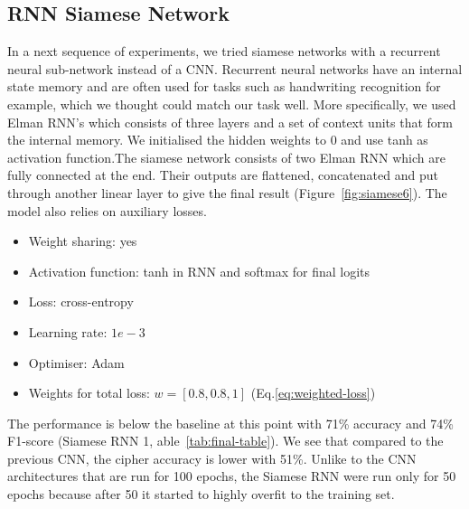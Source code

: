 \documentclass[10pt,conference,compsocconf]{IEEEtran}
\begin{document}

\subsection{RNN Siamese Network}
In a next sequence of experiments, we tried siamese networks with a recurrent neural sub-network instead of a CNN. Recurrent neural networks have an internal state memory and are often used for tasks such as handwriting recognition for example, which we thought could match our task well. More specifically, we used Elman RNN's which consists of three layers and a set of context units that form the internal memory. We initialised the hidden weights to 0 and use tanh as activation function.The siamese network consists of two Elman RNN which are fully connected at the end. Their outputs are flattened, concatenated and put through another linear layer to give the final result (Figure~\ref{fig:siamese6}). The model also relies on auxiliary losses.
\begin{itemize}
    \item Weight sharing: yes 
    \item Activation function: tanh in RNN and softmax for final logits
    \item Loss: cross-entropy
    \item Learning rate: $1e-3$
    \item Optimiser: Adam
    \item Weights for total loss: $w = [0.8, 0.8, 1]$ (Eq.\ref{eq:weighted-loss})
\end{itemize}

The performance is below the baseline at this point with 71\% accuracy and 74\% F1-score (Siamese RNN 1, able~\ref{tab:final-table}). We see that compared to the previous CNN, the cipher accuracy is lower with  51\%. Unlike to the CNN architectures that are run for 100 epochs, the Siamese RNN were run only for 50 epochs because after 50 it started to highly overfit to the training set. 
\end{document}
